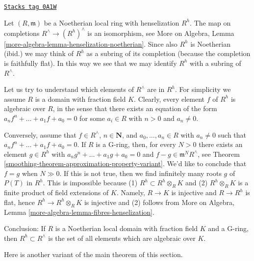 \begin{example}
\label{smoothing-example-describe-henselian}
\href{https://stacks.math.columbia.edu/tag/0A1W}{\texttt{Stacks tag 0A1W}}

Let $(R, \mathfrak m)$ be a Noetherian local ring with henselization $R^h$.
The map on completions $R^\wedge \to (R^h)^\wedge$ is an isomorphism, see
More on Algebra, Lemma \ref{more-algebra-lemma-henselization-noetherian}.
Since also $R^h$ is Noetherian (ibid.) we may think of $R^h$ as a subring
of its completion (because the completion is faithfully flat). In this way
we see that we may identify $R^h$ with a subring of $R^\wedge$.

\medskip\noindent
Let us try to understand which elements of $R^\wedge$ are in $R^h$. For
simplicity we assume $R$ is a domain with fraction field $K$. Clearly,
every element $f$ of $R^h$ is algebraic over $R$, in the sense that
there exists an equation of the form $a_n f^n + \ldots + a_1 f + a_0 = 0$
for some $a_i \in R$ with $n > 0$ and $a_n \not = 0$.

\medskip\noindent
Conversely, assume that $f \in R^\wedge$, $n \in \mathbf{N}$, and
$a_0, \ldots, a_n \in R$ with $a_n \not = 0$ such that
$a_n f^n + \ldots + a_1 f + a_0 = 0$. If $R$ is a G-ring, then, for
every $N > 0$ there exists an element $g \in R^h$ with
$a_n g^n + \ldots + a_1 g + a_0 = 0$ and $f - g \in \mathfrak m^N R^\wedge$,
see Theorem \ref{smoothing-theorem-approximation-property-variant}.
We'd like to conclude that $f = g$ when $N \gg 0$.
If this is not true, then we find infinitely many roots $g$ of $P(T)$
in $R^h$. This is impossible because (1) $R^h \subset R^h \otimes_R K$
and (2) $R^h \otimes_R K$ is a finite product of field extensions of $K$.
Namely, $R \to K$ is injective and $R \to R^h$ is flat, hence
$R^h \to R^h \otimes_R K$ is injective and (2) follows from
More on Algebra, Lemma \ref{more-algebra-lemma-fibres-henselization}.

\medskip\noindent
Conclusion: If $R$ is a Noetherian local domain with fraction field $K$
and a G-ring, then $R^h \subset R^\wedge$ is the set of all elements which
are algebraic over $K$.
\end{example}

Here is another variant of the main theorem of this section.

